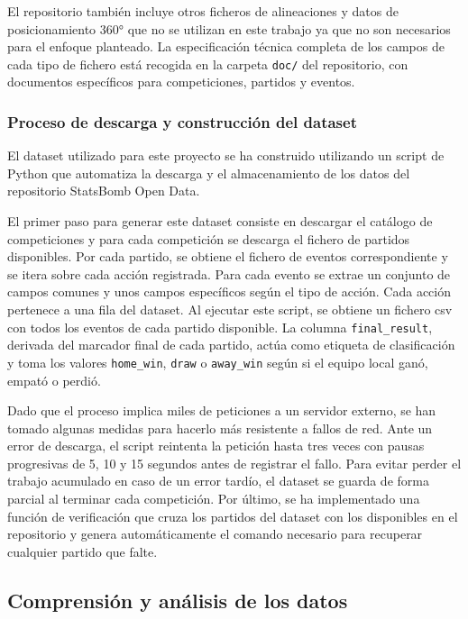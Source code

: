 El repositorio también incluye otros ficheros de alineaciones y datos de posicionamiento 360° que no se utilizan en este trabajo ya que no son necesarios para el enfoque planteado. La especificación técnica completa de los campos de cada tipo de fichero está recogida en la carpeta \texttt{doc/} del repositorio, con documentos específicos para competiciones, partidos y eventos.

\subsubsection{Proceso de descarga y construcción del dataset}

El dataset utilizado para este proyecto se ha construido utilizando un script de Python que automatiza la descarga y el almacenamiento de los datos del repositorio StatsBomb Open Data.

El primer paso para generar este dataset consiste en descargar el catálogo de competiciones y para cada competición se descarga el fichero de partidos disponibles. Por cada partido, se obtiene el fichero de eventos correspondiente y se itera sobre cada acción registrada. Para cada evento se extrae un conjunto de campos comunes y unos campos específicos según el tipo de acción. Cada acción pertenece a una fila del dataset. Al ejecutar este script, se obtiene un fichero csv con todos los eventos de cada partido disponible. La columna \texttt{final\_result}, derivada del marcador final de cada partido, actúa como etiqueta de clasificación y toma los valores \texttt{home\_win}, \texttt{draw} o \texttt{away\_win} según si el equipo local ganó, empató o perdió.

Dado que el proceso implica miles de peticiones a un servidor externo, se han tomado algunas medidas para hacerlo más resistente a fallos de red. Ante un error de descarga, el script reintenta la petición hasta tres veces con pausas progresivas de 5, 10 y 15 segundos antes de registrar el fallo. Para evitar perder el trabajo acumulado en caso de un error tardío, el dataset se guarda de forma parcial al terminar cada competición. Por último, se ha implementado una función de verificación que cruza los partidos del dataset con los disponibles en el repositorio y genera automáticamente el comando necesario para recuperar cualquier partido que falte.

\subsection{Comprensión y análisis de los datos}

